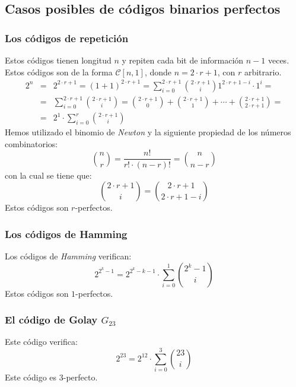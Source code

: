 %
%

\subsection{Casos posibles de c\'odigos binarios perfectos}

\subsubsection{Los c\'odigos de repetici\'on}

Estos c\'odigos tienen longitud $n$ y repiten cada bit de informaci\'on $n-1$
veces. Estos c\'odigos son de la forma $\mathcal{C}[n,1]$, donde $n=2\cdot r+1$,
con $r$ arbitrario.
\begin{eqnarray*} 
2^n&=&2^{2\cdot r+1}= (1+1)^{2\cdot r+1}=\sum_{i=0}^{2\cdot r+1}
{2\cdot r+1 \choose i}1^{2\cdot r+1-i}\cdot 1^i=\\
&=&\sum_{i=0}^{2\cdot r+1}{2\cdot r+1 \choose i} = {2\cdot r+1\choose 0}+
{2\cdot r+1\choose 1}+\cdots+{2\cdot r+1\choose 2\cdot r+1}=\\
&=&2^1\cdot \sum_{i=0}^{r}{2\cdot r+1\choose i}
\end{eqnarray*}
Hemos utilizado el binomio de \emph{Newton} y la siguiente propiedad de los
n\'umeros combinatorios:
\begin{displaymath}
{n\choose r} = \frac{n!}{r!\cdot (n-r)!} = {n \choose n-r}
\end{displaymath}
con la cual se tiene que:
\begin{displaymath}
{2\cdot r +1 \choose i}={2\cdot r+1 \choose 2\cdot r +1-i}
\end{displaymath}
Estos c\'odigos son $r$-perfectos.

\subsubsection{Los c\'odigos de Hamming}

Los c\'odigos de \emph{Hamming} verifican:
\begin{displaymath}
2^{2^k-1}=2^{2^k-k-1}\cdot \sum_{i=0}^1{2^k-1 \choose i}
\end{displaymath}
Estos c\'odigos son $1$-perfectos.

\subsubsection{El c\'odigo de Golay $G_{23}$}

Este c\'odigo verifica:
\begin{displaymath}
2^{23}=2^{12}\cdot \sum_{i=0}^3{23\choose i}
\end{displaymath}
Este c\'odigo es $3$-perfecto.
